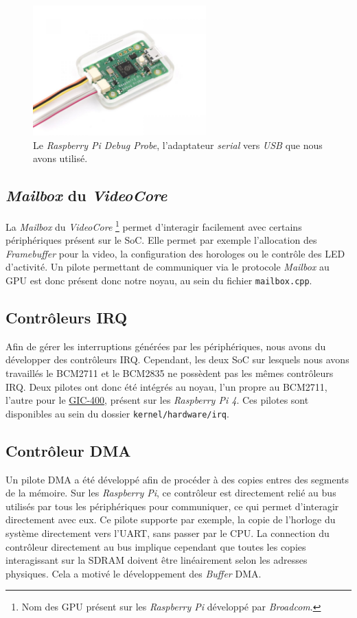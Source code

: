 \documentclass[french, 12pt]{article}
\newcommand{\rpi}{\emph{Raspberry Pi}}
\begin{document}
\begin{figure}[htp]
    \begin{center}
        \includegraphics[height=5cm]{debug-probe.jpg}
    \end{center}
    \caption{Le \textit{Raspberry Pi Debug Probe}, l'adaptateur \textit{serial}
        vers \textit{USB} que nous avons utilisé.}
    \label{img:debug-probe}
\end{figure}


\subsection{\textit{Mailbox} du \textit{VideoCore}}
La \textit{Mailbox} du \textit{VideoCore}%
\footnote{Nom des GPU présent sur les \rpi{} développé par \emph{Broadcom}.}
permet d'interagir facilement avec certains périphériques présent sur le
SoC. Elle permet par exemple l'allocation des \textit{Framebuffer}
pour la video, la configuration des horologes ou le contrôle des LED d'activité.
Un pilote permettant de communiquer via le protocole \textit{Mailbox} au GPU est
donc présent donc notre noyau, au sein du fichier \texttt{mailbox.cpp}.

\subsection{Contrôleurs IRQ}
Afin de gérer les interruptions générées par les périphériques, nous avons du
développer des contrôleurs IRQ. Cependant, les deux SoC sur lesquels nous avons
travaillés le BCM2711 et le BCM2835 ne possèdent pas les mêmes contrôleurs IRQ.
Deux pilotes ont donc été intégrés au noyau, l'un propre au BCM2711, l'autre
pour le \href{https://developer.arm.com/Processors/CoreLink%20GIC-400}{GIC-400},
présent sur les \textit{Raspberry Pi 4}. Ces pilotes sont disponibles au sein du
dossier \texttt{kernel/hardware/irq}.

\subsection{Contrôleur DMA}
Un pilote DMA a été développé afin de procéder à des copies entres des segments
de la mémoire. Sur les \rpi{}, ce contrôleur est directement relié au bus
utilisés par tous les périphériques pour communiquer, ce qui permet d'interagir
directement avec eux. Ce pilote supporte par exemple, la copie de l'horloge du
système directement vers l'UART, sans passer par le CPU. La connection du
contrôleur directement au bus implique cependant que toutes les copies
interagissant sur la SDRAM doivent être linéairement selon les adresses
physiques. Cela a motivé le développement des \textit{Buffer} DMA.
\end{document}

